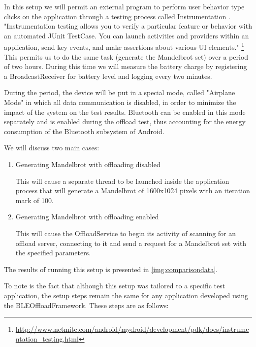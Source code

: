 In this setup we will permit an external program to perform user behavior type clicks on the application through a testing process called Instrumentation \cite{kropp2010automated}. "Instrumentation testing allows you to verify a particular feature or behavior with an automated JUnit TestCase. You can launch activities and providers within an application, send key events, and make assertions about various UI elements." \footnote{\url{http://www.netmite.com/android/mydroid/development/pdk/docs/instrumentation_testing.html}} This permits us to do the same task (generate the Mandelbrot set) over a period of two hours. During this time we will measure the battery charge by registering a BroadcastReceiver for battery level and logging every two minutes.

During the period, the device will be put in a special mode, called "Airplane Mode" in which all data communication is disabled, in order to minimize the impact of the system on the test results. Bluetooth can be enabled in this mode separately and is enabled during the offload test, thus accounting for the energy consumption of the Bluetooth subsystem of Android.

We will discuss two main cases:

\begin{enumerate}
\item{Generating Mandelbrot with offloading disabled}

	This will cause a separate thread to be launched inside the application process that will generate a Mandelbrot of 1600x1024 pixels with an iteration mark of 100.
	
\item{Generating Mandelbrot with offloading enabled}

	This will cause the OffloadService to begin its activity of scanning for an offload server, connecting to it and send a request for a Mandelbrot set with the specified parameters.
	
\end{enumerate}

The results of running this setup is presented in \ref{img:comparisondata}. 

To note is the fact that although this setup was tailored to a specific test application, the setup steps remain the same for any application developed using the BLEOffloadFramework. These steps are as follows:

